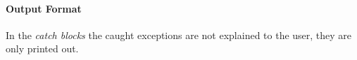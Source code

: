 \paragraph{Output Format}
\begin{itemize}
		In the \textit{catch blocks} the caught exceptions are not explained to the user, they are only printed out.
		\begin{itemize}
		\end{itemize}
\end{itemize}
%
%
